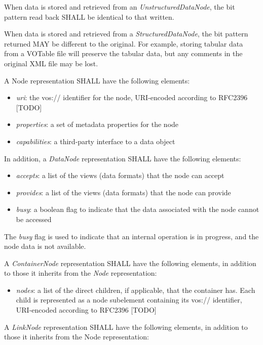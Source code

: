 \documentclass[11pt,a4paper]{ivoa}
\begin{document}
When data is stored and retrieved from an \emph{UnstructuredDataNode}, the bit pattern read back SHALL be identical to that written.

When data is stored and retrieved from a \emph{StructuredDataNode}, the bit pattern returned MAY be different to the original. For example, storing tabular data from a VOTable file will preserve the tabular data, but any comments in the original XML file may be lost.

A Node representation SHALL have the following elements:

\begin{itemize}
    \item \emph{uri}: the vos:// identifier for the node, URI-encoded according to RFC2396 [TODO]
    \item \emph{properties}: a set of metadata properties for the node
    \item \emph{capabilities}: a third-party interface to a data object
\end{itemize}

In addition, a \emph{DataNode} representation SHALL have the following elements:

\begin{itemize}
    \item \emph{accepts}: a list of the views (data formats) that the node can accept
    \item \emph{provides}: a list of the views (data formats) that the node can provide
    \item \emph{busy}: a boolean flag to indicate that the data associated with the node cannot be accessed
\end{itemize}

The \emph{busy} flag is used to indicate that an internal operation is in progress, and the node data is not available.

A \emph{ContainerNode} representation SHALL have the following elements, in addition to those it inherits from the \emph{Node} representation:

\begin{itemize}
    \item \emph{nodes}: a list of the direct children, if applicable, that the container has. Each child is represented as a node subelement containing its vos:// identifier, URI-encoded according to RFC2396 [TODO]
\end{itemize}

A \emph{LinkNode} representation SHALL have the following elements, in addition to those it inherits from the Node representation:
\end{document}
